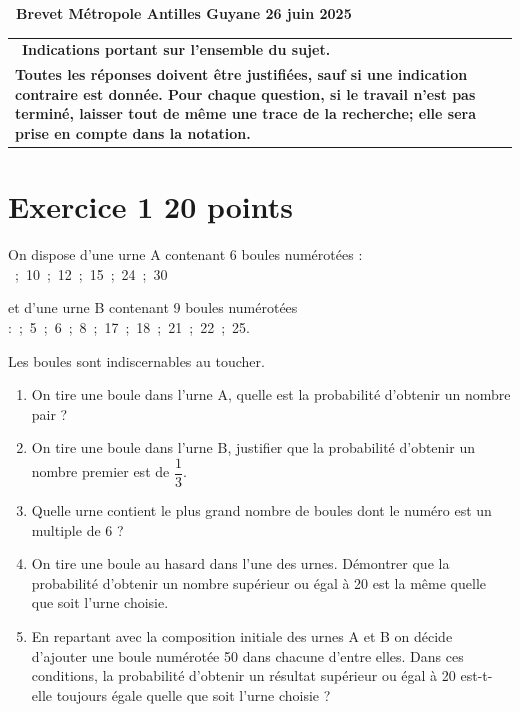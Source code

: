 \documentclass[11pt]{article}
\begin{document}
\newpage
\hypertarget{Metropole}{}
\label{Metropole}

\pagestyle{fancy}
\thispagestyle{empty}
\begin{center} {\Large \textbf{\decofourleft~Brevet Métropole Antilles Guyane 26 juin 2025 \decofourright}}
\end{center}

\begin{tabularx}{\linewidth}{|X|} \hline
	\hfill~\textbf{Indications portant sur l'ensemble du sujet.}\hfill~\\
	\textbf{Toutes les réponses doivent être justifiées, sauf si une indication contraire est donnée. Pour chaque question, si le travail n'est pas terminé, laisser tout de même une trace de la recherche; elle sera prise en compte dans la notation.}\\ \hline
\end{tabularx}

\section*{Exercice 1 \hfill 20 points}

On dispose d'une urne A contenant 6 boules numérotées : ~;~10~;~12~;~15~;~24~;~30

et d'une urne B contenant 9 boules numérotées :~;~5~;~6~;~8~;~17~;~18~;~21~;~22~;~25.

Les boules sont indiscernables au toucher.

\medskip

	\begin{enumerate}
		\item On tire une boule dans l'urne A, quelle est la probabilité d'obtenir un nombre pair ?
		\item On tire une boule dans l'urne B, justifier que la probabilité d'obtenir un nombre premier est de $\dfrac{1}{3}$.
		\item Quelle urne contient le plus grand nombre de boules dont le numéro est un multiple de 6 ?
		\item On tire une boule au hasard dans l'une des urnes. Démontrer que la probabilité d'obtenir un nombre supérieur ou égal à 20 est la même quelle que soit l'urne choisie.
		\item En repartant avec la composition initiale des urnes A et B on décide d'ajouter une boule numérotée 50 dans chacune d'entre elles. Dans ces conditions, la probabilité d'obtenir un résultat supérieur ou égal à 20 est-t-elle toujours égale quelle que soit l'urne choisie ?
	\end{enumerate}
\end{document}
